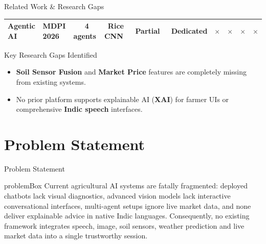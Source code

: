\documentclass[aspectratio=169, 10pt]{beamer}
\newcommand{\ok}[1]{{\color{green!60!black}\textbf{\checkmark}\ \scriptsize #1}}
\newcommand{\ko}{{\color{red!70!black}\textbf{$\times$}}}
\begin{document}
\begin{frame}{Related Work \& Research Gaps}
{\begin{tabular}{llcccccccc}
            Agentic AI \cite{agenticmdpi2026} & MDPI 2026 & \ok{4 agents} & \ok{Rice CNN} & \ok{Partial} & \ok{Dedicated} & \ko & \ko & \ko & \ko \\
            \bottomrule
        \end{tabular}
    }
    \vspace{0.15cm}
    \begin{block}{\footnotesize Key Research Gaps Identified}
        \footnotesize
        \begin{itemize}
            \item \textbf{Soil Sensor Fusion} and \textbf{Market Price} features are completely missing from existing systems.
            \item No prior platform supports explainable AI (\textbf{XAI}) for farmer UIs or comprehensive \textbf{Indic speech} interfaces.
        \end{itemize}
    \end{block}
\end{frame}

\section{Problem Statement}
\begin{frame}{Problem Statement}
    \vspace{0.8cm}
    \begin{beamercolorbox}[wd=\textwidth, rounded=true, shadow=true, sep=0.4cm]{problemBox}
        Current agricultural AI systems are fatally fragmented: deployed chatbots lack visual diagnostics, advanced vision models lack interactive conversational interfaces, multi-agent setups ignore live market data, and none deliver explainable advice in native Indic languages. Consequently, no existing framework integrates speech, image, soil sensors, weather prediction and live market data into a single trustworthy session.
    \end{beamercolorbox}
\end{frame}


\end{document}
